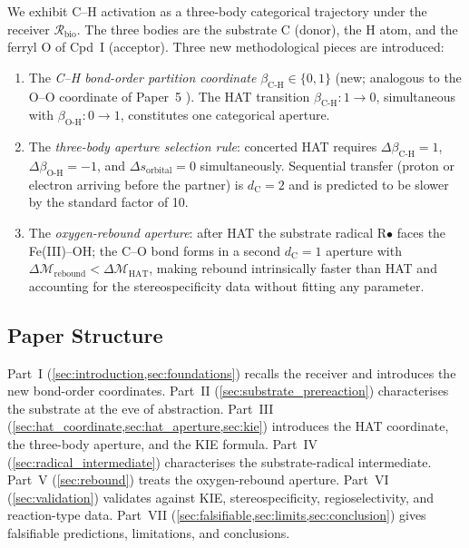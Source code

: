 \documentclass[11pt,twocolumn,a4paper]{article}
\theoremstyle{definition}
\theoremstyle{remark}
\newcommand{\Recv}{\mathcal{R}}
\newcommand{\depth}{\mathcal{M}}
\newcommand{\dC}{d_{\mathrm{C}}}
\newcommand{\betaCH}{\beta_{\mathrm{C\text{-}H}}}
\newcommand{\betaOH}{\beta_{\mathrm{O\text{-}H}}}
\begin{document}
We exhibit C--H activation as a three-body categorical trajectory under the
receiver $\Recv_{\mathrm{bio}}$. The three bodies are the substrate
C (donor), the H atom, and the ferryl O of Cpd~I (acceptor). Three
new methodological pieces are introduced:

\begin{enumerate}[leftmargin=*, nosep]
\item The \emph{C--H bond-order partition coordinate} $\betaCH \in \{0,1\}$
  (new; analogous to the O--O coordinate of Paper~5
  \citep{sachikonye2025_paper5}). The HAT transition $\betaCH: 1 \to 0$,
  simultaneous with $\betaOH: 0 \to 1$, constitutes one categorical aperture.

\item The \emph{three-body aperture selection rule}: concerted HAT requires
  $\Delta\betaCH = 1$, $\Delta\betaOH = -1$, and $\Delta s_{\mathrm{orbital}} = 0$
  simultaneously. Sequential transfer (proton or electron arriving before the
  partner) is $\dC = 2$ and is predicted to be slower by the standard factor
  of 10.

\item The \emph{oxygen-rebound aperture}: after HAT the substrate radical R$\bullet$
  faces the Fe(III)--OH; the C--O bond forms in a second $\dC = 1$ aperture
  with $\Delta\depth_{\mathrm{rebound}} < \Delta\depth_{\mathrm{HAT}}$, making
  rebound intrinsically faster than HAT and accounting for the stereospecificity
  data without fitting any parameter.
\end{enumerate}

\subsection{Paper Structure}

Part~I (\cref{sec:introduction,sec:foundations}) recalls the receiver and
introduces the new bond-order coordinates. Part~II (\cref{sec:substrate_prereaction})
characterises the substrate at the eve of abstraction. Part~III
(\cref{sec:hat_coordinate,sec:hat_aperture,sec:kie}) introduces the HAT
coordinate, the three-body aperture, and the KIE formula. Part~IV
(\cref{sec:radical_intermediate}) characterises the substrate-radical
intermediate. Part~V (\cref{sec:rebound}) treats the oxygen-rebound aperture.
Part~VI (\cref{sec:validation}) validates against KIE, stereospecificity,
regioselectivity, and reaction-type data. Part~VII
(\cref{sec:falsifiable,sec:limits,sec:conclusion}) gives falsifiable predictions,
limitations, and conclusions.
\end{document}
